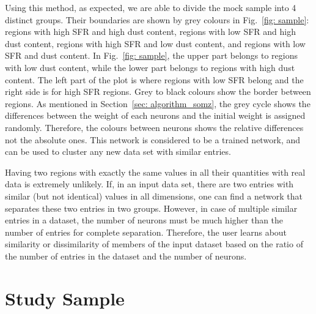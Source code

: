 Using this method, as expected, we are able to divide the mock sample into 4 distinct groups. Their boundaries are shown by grey colours in Fig.~\ref{fig: sample}: regions with high SFR and high dust content, regions with low SFR and high dust content, regions with high SFR and low dust content, and regions with low SFR and dust content. 
In Fig.~\ref{fig: sample}, the upper part belongs to regions with low dust content, while the lower part belongs to regions with high dust content.
The left part of the plot is where regions with low SFR belong and the right side is for high SFR regions.
Grey to black colours show the border between regions.
As mentioned in Section~\ref{sec: algorithm_somz}, the grey cycle shows the differences between the weight of each neurons and the initial weight is assigned randomly.
Therefore, the colours between neurons shows the relative differences not the absolute ones.
This network is considered to be a trained network, and can be used to cluster any new data set with similar entries.

Having two regions with exactly the same values in all their quantities with real data is extremely unlikely. 
If, in an input data set, there are two entries with similar (but not identical) values in all dimensions, one can find a network that separates these two entries in two groups.  
However, in case of multiple similar entries in a dataset, the number of neurons must be much higher than the number of entries for complete separation.
Therefore, the user learns about similarity or dissimilarity of members of the input dataset based on the ratio of the number of entries in the dataset and the number of neurons. 

\section{Study Sample}
\label{Sec: data_SOMN}


